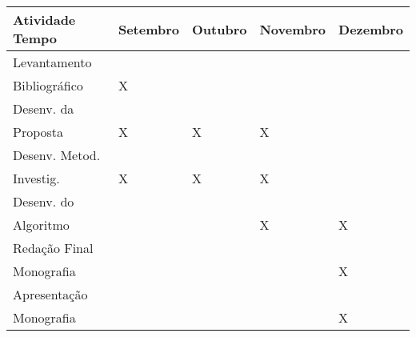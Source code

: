 \documentclass[
	12pt,				%
	openright,			%
	twoside,			%
	a4paper,			%
	chapter=TITLE,		%
	section=TITLE,		%
	english,			%
	french,				%
	spanish,			%
	brazil				%
	]{abntex2}
\begin{document}
\begin{table}[htb]
\ABNTEXfontereduzida
\begin{tabular}{p{2.6cm} | p{1.5cm} | p{1.5cm} | p{1.6cm} | p{1.5cm}}
   \textbf{Atividade Tempo}  & \textbf{Setembro}  & \textbf{Outubro}  & \textbf{Novembro}  & \textbf{Dezembro}\\
    \hline
    Levantamento\\ Bibliográfico & X &  &  & \\
    \hline
    Desenv. da\\ Proposta &X & X & X &  \\
    \hline
    Desenv. Metod.\\ Investig. & X & X & X & \\
    \hline
    Desenv. do\\ Algoritmo  &  &  & X & X\\
    \hline
    Redação Final\\ Monografia &  &  &  & X\\
    \hline
    Apresentação\\ Monografia &  &  &  & X\\
\end{tabular}
\end{table}





\end{document}
